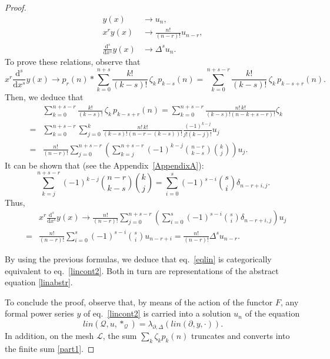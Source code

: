 \documentclass[10pt]{amsart}
\numberwithin{equation}{section}
\theoremstyle{definition}
\begin{document}
\begin{proof}
\begin{align}
y(x)&\longrightarrow u_{n},\\
x^{r} y(x)&\longrightarrow \frac{n!}{(n-r )!} u_{n-r},\\
\frac{\mathrm{d}^{s}}{\mathrm{d}x^{s}}y(x)&\longrightarrow \Delta ^{s}
u_{n}.
\end{align}
To prove these relations, observe that
\begin{equation}
x^{r}\frac{\mathrm{d}^{s}}{\mathrm{d}x^{s}}y(x)\longrightarrow p_{r}(n)*
\sum _{k=0}^{n+s} \frac{k!}{(k-s)!}\,\zeta _{k}\,p_{k-s}(n)=\sum _{k=0}^{n+s-r}
\frac{k!}{(k-s)!}\,\zeta _{k}\,p_{k-s+r}(n).
\label{eq5.15}
\end{equation}
Then, we deduce that
\begin{eqnarray}
&&\sum _{k=0}^{n+s-r} \frac{k!}{(k-s)!}\,\zeta _{k}\,p_{k-s+r}(n)=
\sum _{k=0}^{n+s-r} \frac{n!\,k!}{(k-s)!(n-k+s-r)!}\zeta _{k}
\label{eq5.16}
\\
&=&\sum _{k=0}^{n+s-r}\sum _{j=0}^{k}
\frac{n!\,k!}{(k-s)!(n-r-(k-s))!}\frac{(-1)^{k-j}}{j!(k-j)!}u_{j}
\nonumber
\\
&=&\frac{n!}{(n-r)!}\sum _{j=0}^{n+s-r} \left (\sum _{k=j}^{n+s-r} (-1)^{k-j}
\binom{n-r}{k-s}\binom{k}{j}\right )u_{j}.
\nonumber
\end{eqnarray}
It can be shown that (see the Appendix~\ref{AppendixA}):
\begin{equation}
\sum _{k=j}^{n+s-r} (-1)^{k-j} \binom{n-r}{k-s}\binom{k}{j}=\sum _{i=0}^{s}(-1)^{s-i}
\binom{s}{i}\delta _{n-r+i,j}.
\label{eq5.17}
\end{equation}
Thus,
\begin{eqnarray}
&& x^{r}\frac{\mathrm{d}^{s}}{\mathrm{d}x^{s}}y(x)\longrightarrow
\frac{n!}{(n-r)!}\sum _{j=0}^{n+s-r} \left (\sum _{i=0}^{s}(-1)^{s-i}
\binom{s}{i}\delta _{n-r+i,j}\right )u_{j}
\label{eq5.18}
\\
&=&\frac{n!}{(n-r)!}\sum _{i=0}^{s}(-1)^{s-i}\binom{s}{i}u_{n-r+i}  =
\frac{n!}{(n-r)!}\Delta ^{s}u_{n-r}.
\nonumber
\end{eqnarray}

By using the previous formulas, we deduce that  eq.~\eqref{eqlin} is categorically
equivalent to eq.~\eqref{lincont2}. Both in turn are representations of
the abstract equation  \eqref{linabstr}.

To conclude the proof, observe that, by means of the action of the functor
$F$, any formal power series $y$ of eq.~\eqref{lincont2} is carried into
a solution $u_{n}$ of the equation
\begin{equation*}
lin(\mathcal{Q},u,*_{\mathcal{Q}})=\lambda _{\partial ,\Delta}(lin(
\partial ,y,\cdot )).
\end{equation*}
In addition, on the mesh $\mathcal{L}$, the sum
$\sum _{k} \zeta _{k} p_{k}(n)$ truncates and converts into the finite
sum  \eqref{part1}.
\end{proof}
\end{document}
